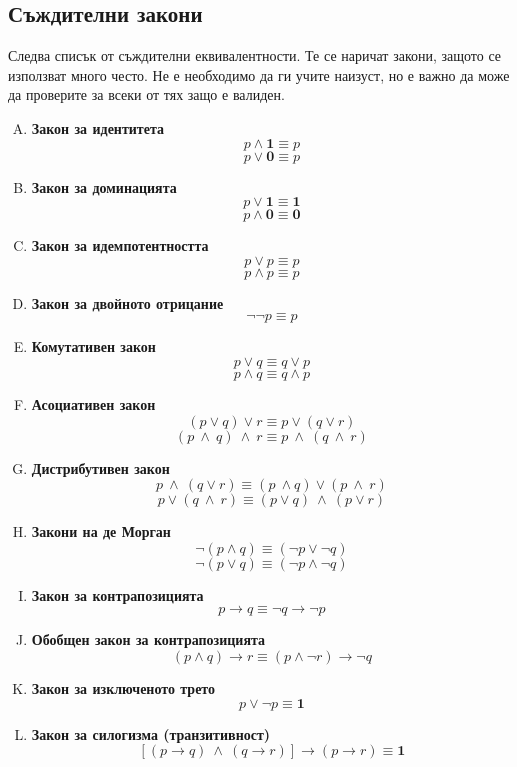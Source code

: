\subsection*{Съждителни закони}

Следва списък от съждителни еквивалентности.
Те се наричат закони, защото се използват много често.
Не е необходимо да ги учите наизуст, но е важно да може да
проверите за всеки от тях защо е валиден.

\begin{enumerate}[A)]
\item
  {\bf Закон за идентитета}
  \[p \land \mathbf{1} \equiv p\]
  \[p \lor \mathbf{0} \equiv p\]
\item
  {\bf Закон за доминацията}
  \[p \lor \mathbf{1} \equiv \mathbf{1}\]
  \[p \land \mathbf{0} \equiv \mathbf{0}\]
\item
  {\bf Закон за идемпотентността}
  \[p \lor p \equiv p\]
  \[p \land p \equiv p\]
\item
  {\bf Закон за двойното отрицание}
  \[\neg \neg p \equiv p\]
\item
  {\bf Комутативен закон}
  \[p\vee q \equiv q\vee p\] 
  \[p \wedge q \equiv q \wedge p\]
\item
  {\bf Асоциативен закон}
  \[(p\vee q)\vee r \equiv p\vee(q\vee r)\]
  \[(p\ \wedge\ q)\ \wedge\ r \equiv p\ \wedge\ (q\ \wedge\ r)\]
\item
  {\bf Дистрибутивен закон}
  \[p\ \wedge\ (q \vee r) \equiv (p\ \wedge q)\vee (p\ \wedge\ r)\]
  \[p\vee (q\ \wedge\ r) \equiv (p\vee q)\ \wedge\ (p\vee r)\]
\item
  {\bf Закони на де Морган}
  \[\neg(p \wedge q) \equiv (\neg p \vee \neg q)\]
  \[\neg(p\vee q) \equiv (\neg p \wedge \neg q)\]
\item
  {\bf Закон за контрапозицията}
  \[p\rightarrow q \equiv \neg q \rightarrow \neg p\]
\item
  {\bf Обобщен закон за контрапозицията}
  \[(p \wedge q)\rightarrow r \equiv (p \wedge \neg r) \rightarrow \neg q\]
\item
  {\bf Закон за изключеното трето}
  \[p\vee \neg p \equiv {\mathbf 1}\]
\item
  {\bf Закон за силогизма (транзитивност)}
  \[[(p\rightarrow q)\ \wedge\ (q\rightarrow r)] \rightarrow (p\rightarrow r) \equiv {\mathbf 1}\]
\end{enumerate}


